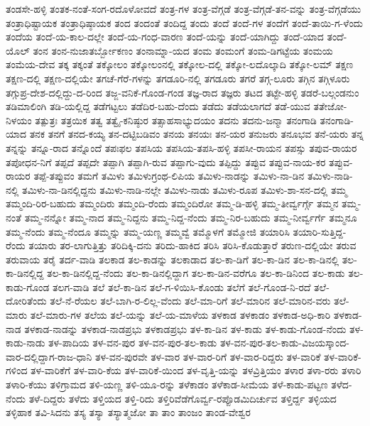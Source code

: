 {ತಂಡಸೇ-ಹಳ್ಳಿ
ತಂತಕ-ನಂತೆ-ಸಂಗ-ರದೊಳೋವದೆ
ತಂತ್ರ-ಗಳ
ತಂತ್ರ-ವೆಗ್ಗಡೆ
ತಂತ್ರ-ವೆಗ್ಗಡೆ-ತನ-ವನ್ನು
ತಂತ್ರ-ವೆಗ್ಗಡೆಯು
ತಂತ್ರಾಧಿಷ್ಟಾಯಕ
ತಂತ್ರಾಧಿಷ್ಠಾಯಕ
ತಂದ
ತಂದಂತೆ
ತಂದಿದ್ದ
ತಂದು
ತಂದೆ
ತಂದೆ-ಗಳ
ತಂದೆಗೆ
ತಂದೆ-ತಾಯಿ-ಗ-ಳೆಂದು
ತಂದೆಯ
ತಂದೆ-ಯ-ಕಾಲ-ದಲ್ಲೇ
ತಂದೆ-ಯ-ಗಂಧ-ವಾರಣ
ತಂದೆ-ಯನ್ನು
ತಂದೆ-ಯಾಗಿದ್ದು
ತಂದೆ-ಯಾದ
ತಂದೆ-ಯೊಲ್
ತಂನ
ತಂನ-ನುಜಾತರ್ಬ್ಬೋಕಣಂ
ತಂನಾಮ್ನಾ-ಯದ
ತಂಮ
ತಂಮಂಗೆ
ತಂಮ-ಡಿಗಟ್ಟೆಯ
ತಂಮಯ
ತಂಮೆಯ-ದೇವ
ತಕ್ಕ
ತಕ್ಕಂತೆ
ತಕ್ಕೋಲಂ
ತಕ್ಕೋಲಂನಲ್ಲಿ
ತಕ್ಕೋಲ-ದಲ್ಲಿ
ತಕ್ಕೋ-ಲದೊಲ್ಕಾದಿ
ತಕ್ಕೋ-ಲಮ್
ತಕ್ಷಣ
ತಕ್ಷಣ-ದಲ್ಲಿ
ತಕ್ಷಣ-ದಲ್ಲಿಯೇ
ತಗಚೆ-ಗೆರೆ-ಗಳನ್ನು
ತಗಡೂರಿ-ನಲ್ಲಿ
ತಗಡೂರು
ತಗರೆ
ತಗ್ಗ-ಲೂರು
ತಗ್ಗಿನ
ತಗ್ಗಿಳೂರು
ತಗ್ಗುಪ್ರ-ದೇಶ-ದಲ್ಲಿದ್ದು-ದ-ರಿಂದ
ತಜ್ಜ-ವನಿಕೆ-ಗೊಂಡ-ಗಂಡ
ತಜ್ಞ-ರಾದ
ತಜ್ಞರು
ತಟದ
ತಟ್ಟೇ-ಹಳ್ಳಿ
ತಡರೆ-ಬಲ್ಗಂಡನುಂ
ತಡಿಮಾಲಿಂಗಿ
ತಡಿ-ಯಲ್ಲಿದ್ದ
ತಡೆಗಟ್ಟಲು
ತಡೆದಿರ-ಬಹು-ದೆಂದು
ತಡೆದು
ತಡೆಯಲಾಗದೆ
ತಡೆ-ಯುವ
ತತೇಜೋ-ನಿಳಯಂ
ತತ್ಪುತ್ರಃ
ತತ್ರಯಿಕ
ತತ್ವ
ತತ್ವೈ-ಕನಿಷ್ಠುರ
ತತ್ಸಾಹಸಾಭ್ಯುದಯಂ
ತದನು
ತದನು-ಜನ್ಮಾ
ತನಂಗಾಡಿ
ತನಂಗಾಡಿ-ಯಾದ
ತನಕ
ತನಗೆ
ತನದ-ಕಯ್ಯ
ತನ-ದಟ್ಟಿಬಡಿವಂ
ತನಯ
ತನಯಃ
ತನ-ಯರ
ತನುಜರು
ತನೂಭವ
ತನೆ-ಯರು
ತನ್ನ
ತನ್ನನ್ನು
ತನ್ನೂ-ರಾದ
ತನ್ನೊಂದೆ
ತಪಃಫಲ
ತಪಸಿಯ
ತಪಸಿಯ-ತಪಸಿ-ಹಳ್ಳಿ
ತಪಸೀ-ರಾಯನ
ತಪಸ್ಸು
ತಪುವ-ರಾಯರ
ತಪೋಧನ-ನಿಗೆ
ತಪ್ಪದೆ
ತಪ್ಪದೇ
ತಪ್ಪಾಗಿ
ತಪ್ಪಾಗಿ-ರುವ
ತಪ್ಪಾಗು-ವುದು
ತಪ್ಪಿದ್ದು
ತಪ್ಪುವ
ತಪ್ಪುವ-ನಾಯ-ಕರ
ತಪ್ಪುವ-ರಾಯರ
ತಪ್ಪೆ-ತಪ್ಪುವಂ
ತಮಗೆ
ತಮಿಳು
ತಮಿಳುಗ್ರಂಥ-ಲಿಪಿಯ
ತಮಿಳು-ನಾಡನ್ನು
ತಮಿಳು-ನಾ-ಡಿನ
ತಮಿಳು-ನಾಡಿ-ನಲ್ಲಿ
ತಮಿಳು-ನಾ-ಡಿನಲ್ಲಿದ್ದನು
ತಮಿಳು-ನಾಡಿ-ನಲ್ಲೇ
ತಮಿಳು-ನಾಡು
ತಮಿಳು-ರೂಪ
ತಮಿಳು-ಶಾ-ಸನ-ದಲ್ಲಿ
ತಮ್ಮ
ತಮ್ಮಂದಿ-ರಿರ-ಬಹುದು
ತಮ್ಮಂದಿರು
ತಮ್ಮಂದಿ-ರೆಂದು
ತಮ್ಮಂದಿರೋ
ತಮ್ಮ-ಡಿ-ಹಳ್ಳಿ
ತಮ್ಮ-ತೀರ್ವ್ವರ್ಗ್ಗೆ
ತಮ್ಮನ
ತಮ್ಮ-ನಂತೆ
ತಮ್ಮ-ನನ್ನೋ
ತಮ್ಮ-ನಾದ
ತಮ್ಮ-ನಿದ್ದನು
ತಮ್ಮ-ನಿದ್ದ-ನೆಂದು
ತಮ್ಮ-ನಿರ-ಬಹುದು
ತಮ್ಮ-ನೀರ್ವ್ವರ್ಗೆ
ತಮ್ಮನೂ
ತಮ್ಮ-ನೆಂದು
ತಮ್ಮ-ನೆಂದೂ
ತಮ್ಮನ್ನು
ತಮ್ಮ-ಯಣ್ಣ
ತಮ್ಮವ್ವೆ
ತಮ್ಮೊಳಗೆ
ತಮ್ಮೋಜಿ
ತಯಾರಿಸಿ
ತಯಾರಿ-ಸುತ್ತಿದ್ದ-ರೆಂದು
ತಯಾರು
ತರ-ಲಾಗುತ್ತಿತ್ತು
ತರಿದಿಕ್ಕಿ-ದನು
ತರಿದು-ಹಾಕಿದ
ತರಿಸಿ
ತರಿಸಿ-ಕೊಡುತ್ತಾರೆ
ತರುಣ-ದಲ್ಲಿಯೇ
ತರುವ
ತರುವಾಯ
ತರೈ
ತರ್ದ-ವಾಡಿ
ತಲಕಾಡ
ತಲ-ಕಾಡನ್ನು
ತಲಕಾಡಾದ
ತಲ-ಕಾ-ಡಿಗೆ
ತಲ-ಕಾ-ಡಿನ
ತಲ-ಕಾ-ಡಿನಲ್ಲಿ
ತಲ-ಕಾ-ಡಿನಲ್ಲಿದ್ದ
ತಲ-ಕಾ-ಡಿನಲ್ಲಿದ್ದ-ನೆಂದು
ತಲ-ಕಾ-ಡಿನಲ್ಲಿದ್ದಾಗ
ತಲ-ಕಾ-ಡಿನ-ವರೆಗೂ
ತಲ-ಕಾ-ಡಿನಿಂದ
ತಲ-ಕಾಡು
ತಲ-ಕಾಡು-ಗೊಂಡ
ತಲಗ-ವಾಡಿ
ತಲೆ
ತಲೆ-ಕಾ-ಡಿನ
ತಲೆ-ಗ-ಳಿಯಿಸಿ-ಕೊಂಡು
ತಲೆಗೆ
ತಲೆ-ಗೊಂಡ-ನಿ-ರದೆ
ತಲೆ-ದೋರಿತೆಂದು
ತಲೆ-ನೆ-ರೆಯಲ
ತಲೆ-ಬಾಗಿ-ರ-ಲಿಲ್ಲ-ವೆಂದು
ತಲೆ-ಮಾ-ರಿಗೆ
ತಲೆ-ಮಾರಿನ
ತಲೆ-ಮಾರಿನ-ವರು
ತಲೆ-ಮಾರು
ತಲೆ-ಮಾರು-ಗಳ
ತಲೆಯ
ತಲೆ-ಯನ್ನು
ತಲೆ-ಯ-ಮಾಳೆಯ
ತಳಕಾಡ
ತಳಕಾಡಂ
ತಳಕಾಡ-ಅಧಿ-ಕಾರಿ
ತಳಕಾಡ-ನಾಡ
ತಳಕಾಡ-ನಾಡನ್ನು
ತಳಕಾಡ-ನಾಡಪ್ರಭು
ತಳಕಾಡಪ್ರಭು
ತಳ-ಕಾ-ಡಿನ
ತಳ-ಕಾಡು
ತಳ-ಕಾಡು-ಗೊಂಡ-ನೆಂದು
ತಳ-ಕಾಡು-ನಾಡು
ತಳ-ಪಾದಿಯ
ತಳ-ವನ-ಪುರ
ತಳ-ವನ-ಪುರ-ತಲ-ಕಾಡು
ತಳ-ವನ-ಪುರ-ತಲ-ಕಾಡು-ವಿಜಯಸ್ಕಾಂದ-ವಾರ-ದಲ್ಲಿದ್ದಾಗ-ರಾಜ-ಧಾನಿ
ತಳ-ವನ-ಪುರವೇ
ತಳ-ವಾರ
ತಳ-ವಾರ-ರಿಗೆ
ತಳ-ವಾರ-ರಿದ್ದರು
ತಳ-ವಾರಿಕೆ
ತಳ-ವಾರಿಕೆ-ಗಳಿಂದ
ತಳ-ವಾರಿಕೆಗೆ
ತಳ-ವಾರಿ-ಕೆಯ
ತಳ-ವಾರಿಕೆ-ಯಿಂದ
ತಳ-ವೃತ್ತಿ-ಯನ್ನು
ತಳವ್ರಿತ್ತಿಯಂ
ತಳಾರ
ತಳಾ-ರರು
ತಳಾರಿ
ತಳಾರಿ-ಕೆಯು
ತಳಿಗ್ರಾಮದ
ತಳಿ-ಯಣ್ಣ
ತಳಿ-ಯೂ-ರನ್ನು
ತಳೆಕಾಡಂ
ತಳೆಕಾಡ-ಸೀಮೆಯ
ತಳೆ-ಕಾಡು-ಪಟ್ಟಣ
ತಳೆದ-ನೆಂದು
ತಳೆ-ದಿದ್ದರು
ತಳೆದು
ತಳ್ತಿಯದ
ತಳ್ತಿ-ರಿದು
ತಳ್ತಿರಿವೆಡೆಗೊರ್ವ್ವ-ರಪ್ಪೊಡಮಿದಿರ್ಚುವ
ತಳ್ತಿರ್ದ್ದ
ತಳ್ಳಿಯದ
ತಳ್ಳಿಹಾಕ
ತವಿ-ಸಿದನು
ತಸ್ಯ
ತಸ್ಯಾ
ತಸ್ಯಾತ್ಮಜೋ
ತಾ
ತಾಂ
ತಾಂಜಂ
ತಾಂಡ-ವೇಶ್ವರ
}
